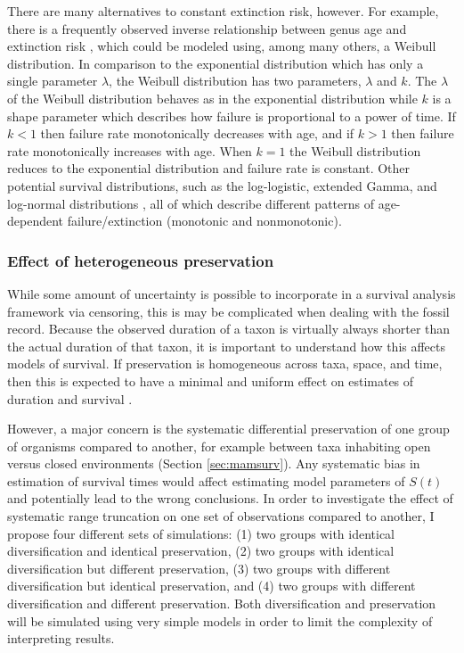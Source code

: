 \documentclass[12pt,letterpaper]{article}
\begin{document}
There are many alternatives to constant extinction risk, however. For example, there is a frequently observed inverse relationship between genus age and extinction risk \citep{Finnegan2008}, which could be modeled using, among many others, a Weibull distribution. In comparison to the exponential distribution which has only a single parameter \(\lambda\), the Weibull distribution has two parameters, \(\lambda\) and \(k\). The \(\lambda\) of the Weibull distribution behaves as in the exponential distribution while \(k\) is a shape parameter which describes how failure is proportional to a power of time. If \(k < 1\) then failure rate monotonically decreases with age, and if \(k > 1\) then failure rate monotonically increases with age. When \(k = 1\) the Weibull distribution reduces to the exponential distribution and failure rate is constant. Other potential survival distributions, such as the log-logistic, extended Gamma, and log-normal distributions \citep{Kleinbaum2005}, all of which describe different patterns of age-dependent failure/extinction (monotonic and nonmonotonic).

\subsubsection{Effect of heterogeneous preservation} \label{sec:survsim}
While some amount of uncertainty is possible to incorporate in a survival analysis framework via censoring, this is may be complicated when dealing with the fossil record. Because the observed duration of a taxon is virtually always shorter than the actual duration of that taxon, it is important to understand how this affects models of survival. If preservation is homogeneous across taxa, space, and time, then this is expected to have a minimal and uniform effect on estimates of duration and survival \citep{Sepkoski1975,Foote1996e,Foote1997c}.

However, a major concern is the systematic differential preservation of one group of organisms compared to another, for example between taxa inhabiting open versus closed environments (Section \ref{sec:mamsurv}). Any systematic bias in estimation of survival times would affect estimating model parameters of \(S(t)\) and potentially lead to the wrong conclusions. In order to investigate the effect of systematic range truncation on one set of observations compared to another, I propose four different sets of simulations: (1) two groups with identical diversification and identical preservation, (2) two groups with identical diversification but different preservation, (3) two groups with different diversification but identical preservation, and (4) two groups with different diversification and different preservation. Both diversification and preservation will be simulated using very simple models in order to limit the complexity of interpreting results. 
\end{document}
